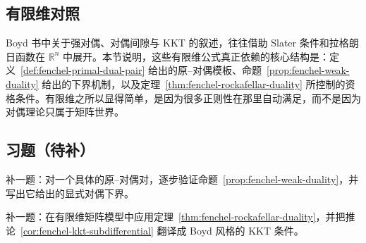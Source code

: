 \subsection*{有限维对照}

Boyd 书中关于强对偶、对偶间隙与 KKT 的叙述，往往借助 Slater 条件和拉格朗日函数在 $\mathbb R^n$ 中展开。本节说明，这些有限维公式真正依赖的核心结构是：定义~\ref{def:fenchel-primal-dual-pair} 给出的原--对偶模板、命题~\ref{prop:fenchel-weak-duality} 给出的下界机制，以及定理~\ref{thm:fenchel-rockafellar-duality} 所控制的资格条件。有限维之所以显得简单，是因为很多正则性在那里自动满足，而不是因为对偶理论只属于矩阵世界。

\subsection*{习题（待补）}

\begin{exercise}[弱对偶占位]\label{exr:weak-duality-placeholder}
补一题：对一个具体的原--对偶对，逐步验证命题~\ref{prop:fenchel-weak-duality}，并写出它给出的显式对偶下界。
\end{exercise}

\begin{exercise}\label{exr:fenchel-rockafellar-placeholder}
补一题：在有限维矩阵模型中应用定理~\ref{thm:fenchel-rockafellar-duality}，并把推论~\ref{cor:fenchel-kkt-subdifferential} 翻译成 Boyd 风格的 KKT 条件。
\end{exercise}
